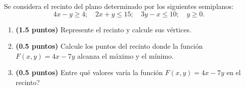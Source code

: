 
Se considera el recinto del plano determinado por los siguientes semiplanos:
\[
4x-y\geq4;\quad2x+y\leq15;\quad3y-x\leq10;\quad y\geq0.
\]
\begin{enumerate}[label=\alph*)]
\item \textbf{(1.5 puntos)} Represente el recinto y calcule sus vértices.
\item \textbf{(0.5 puntos)} Calcule los puntos del recinto donde la función $F(x,y)=4x-7y$ alcanza el máximo y el mínimo.
\item \textbf{(0.5 puntos)} \textquestiondown{}Entre qué valores varía la función $F(x,y)=4x-7y$ en el recinto?
\end{enumerate}
